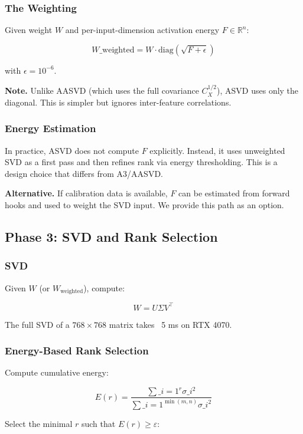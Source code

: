 \subsubsection{The Weighting}

Given weight $W$ and per-input-dimension activation energy $F \in \mathbb{R}^n$:

\[
W\_\text{weighted} = W \cdot \text{diag}(\sqrt{F + \epsilon})
\]

with $\epsilon = 10^{-6}$.

\textbf{Note.} Unlike AASVD (which uses the full covariance $C_X^{1/2}$), ASVD 
uses only the diagonal. This is simpler but ignores inter-feature 
correlations.

\subsubsection{Energy Estimation}

In practice, ASVD does not compute $F$ explicitly. Instead, it uses 
unweighted SVD as a first pass and then refines rank via energy 
thresholding. This is a design choice that differs from A3/AASVD.

\textbf{Alternative.} If calibration data is available, $F$ can be estimated 
from forward hooks and used to weight the SVD input. We provide this path 
as an option.

\subsection{Phase 3: SVD and Rank Selection}

\subsubsection{SVD}

Given $W$ (or $W_\text{weighted}$), compute:

\[
W = U \Sigma V^\top
\]

The full SVD of a $768 \times 768$ matrix takes ~5 ms on RTX 4070.

\subsubsection{Energy-Based Rank Selection}

Compute cumulative energy:

\[
E(r) = \frac{\sum\_{i=1}^r \sigma\_i^2}{\sum\_{i=1}^{\min(m, n)} \sigma\_i^2}
\]

Select the minimal $r$ such that $E(r) \geq \varepsilon$:

